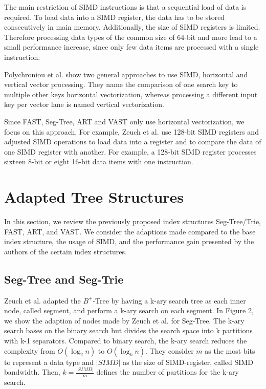 \documentclass[runningheads,a4paper]{llncs}
\begin{document}
The main restriction of SIMD instructions is that a sequential load of data is required. To load data into a SIMD register, the data has to be stored consecutively in main memory. Additionally, the size of SIMD registers is limited. Therefore processing data types of the common size of 64-bit and more lead to a small performance increase, since only few data items are processed with a single instruction.

Polychroniou et al. \cite{polychroniou2015rethinking} show two general approaches to use SIMD, horizontal and vertical vector processing. They name the comparison of one search key to multiple other keys horizontal vectorization, whereas processing a different input key per vector lane is named vertical vectorization.

Since FAST, Seg-Tree, ART and VAST only use horizontal vectorization, we focus on this approach.  For example, Zeuch et al. \cite{zeuch2014adapting} use 128-bit SIMD registers and adjusted SIMD operations to load data into a register and to compare the data of one SIMD register with another. For example, a 128-bit SIMD register processes sixteen 8-bit or eight 16-bit data items with one instruction. %


\section{Adapted Tree Structures}
In this section, we review the previously proposed index structures Seg-Tree/Trie, FAST, ART, and VAST. We consider the adaptions made compared to the base index structure, the usage of SIMD, and the performance gain presented by the authors of the certain index structures.
\subsection{Seg-Tree and Seg-Trie}\label{SCM}
Zeuch et al. adapted the $B^+$-Tree by having a k-ary search tree as each inner node, called segment, and perform a k-ary search on each segment.  In Figure 2, we show the adaption of nodes made by Zeuch et al. for Seg-Tree. The k-ary search bases on the binary search but divides the search space into k partitions with k-1 separators. Compared to binary search, the k-ary search reduces the complexity from $O(\log_{2}{n})$ to $O(\log_{k}{n})$. They consider $m$ as the most bits to represent a data type and $\vert SIMD \vert$ as the size of SIMD-register, called SIMD bandwidth. Then, $k = \frac{\vert SIMD \vert }{m}$ defines the number of partitions for the k-ary search. 
\end{document}
